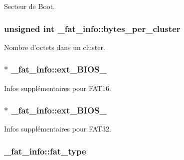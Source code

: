 \-Secteur de \-Boot. \hypertarget{struct__fat__info_ac1ba92d928512827ab7978f136efda96}{
\subsubsection[{bytes\-\_\-per\-\_\-cluster}]{\setlength{\rightskip}{0pt plus 5cm}unsigned int {\bf \-\_\-fat\-\_\-info\-::bytes\-\_\-per\-\_\-cluster}}}\label{struct__fat__info_ac1ba92d928512827ab7978f136efda96}
\-Nombre d'octets dans un cluster. \hypertarget{struct__fat__info_a4da4c2a7a629ca59a686822e6447acb8}{
\subsubsection[{ext\-\_\-\-B\-I\-O\-S\-\_\-16}]{$\ast$ {\bf \-\_\-fat\-\_\-info\-::ext\-\_\-\-B\-I\-O\-S\-\_}}}\label{struct__fat__info_a4da4c2a7a629ca59a686822e6447acb8}
\-Infos supplémentaires pour \-F\-A\-T16. \hypertarget{struct__fat__info_aab203e7eb3c2027e3034d7765a2d5281}{
\subsubsection[{ext\-\_\-\-B\-I\-O\-S\-\_\-32}]{$\ast$ {\bf \-\_\-fat\-\_\-info\-::ext\-\_\-\-B\-I\-O\-S\-\_}}}\label{struct__fat__info_aab203e7eb3c2027e3034d7765a2d5281}
\-Infos supplémentaires pour \-F\-A\-T32. \hypertarget{struct__fat__info_af9e994d6d2c5211614ca61cfa4492500}{
\subsubsection[{fat\-\_\-type}]{ {\bf \-\_\-fat\-\_\-info\-::fat\-\_\-type}}}\label{struct__fat__info_af9e994d6d2c5211614ca61cfa4492500}
